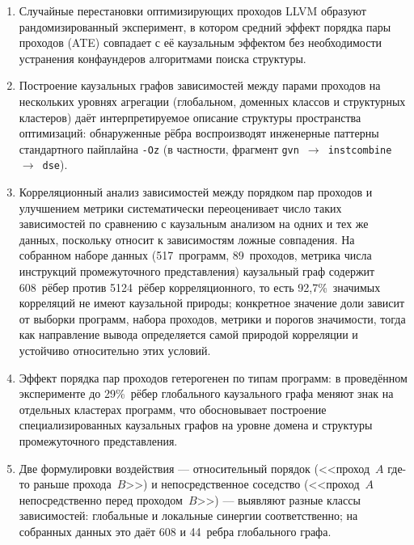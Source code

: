 \begin{enumerate}
    \item Случайные перестановки оптимизирующих проходов LLVM образуют рандомизированный эксперимент, в котором средний эффект порядка пары проходов (ATE) совпадает с её каузальным эффектом без необходимости устранения конфаундеров алгоритмами поиска структуры.

    \item Построение каузальных графов зависимостей между парами проходов на нескольких уровнях агрегации (глобальном, доменных классов и структурных кластеров) даёт интерпретируемое описание структуры пространства оптимизаций: обнаруженные рёбра воспроизводят инженерные паттерны стандартного пайплайна \texttt{-Oz} (в частности, фрагмент \texttt{gvn}~$\to$~\texttt{instcombine}~$\to$~\texttt{dse}).

    \item Корреляционный анализ зависимостей между порядком пар проходов и улучшением метрики систематически переоценивает число таких зависимостей по сравнению с каузальным анализом на одних и тех же данных, поскольку относит к зависимостям ложные совпадения. На собранном наборе данных (517~программ, 89~проходов, метрика числа инструкций промежуточного представления) каузальный граф содержит 608~рёбер против 5124~рёбер корреляционного, то есть 92{,}7\%~значимых корреляций не имеют каузальной природы; конкретное значение доли зависит от выборки программ, набора проходов, метрики и порогов значимости, тогда как направление вывода определяется самой природой корреляции и устойчиво относительно этих условий.

    \item Эффект порядка пар проходов гетерогенен по типам программ: в проведённом эксперименте до 29\%~рёбер глобального каузального графа меняют знак на отдельных кластерах программ, что обосновывает построение специализированных каузальных графов на уровне домена и структуры промежуточного представления.

    \item Две формулировки воздействия --- относительный порядок (<<проход~$A$ где-то раньше прохода~$B$>>) и непосредственное соседство (<<проход~$A$ непосредственно перед проходом~$B$>>) --- выявляют разные классы зависимостей: глобальные и локальные синергии соответственно; на собранных данных это даёт 608 и 44~ребра глобального графа.
\end{enumerate}

\newpage
